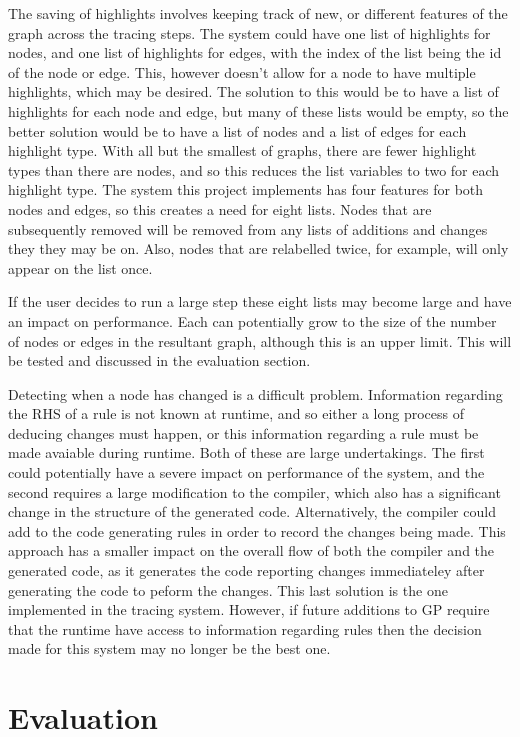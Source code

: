 \documentclass{UoYCSproject}
\begin{document}
The saving of highlights involves keeping track of new, or different features of the graph across the tracing steps. The system could have one list of highlights for nodes, and one list of highlights for edges, with the index of the list being the id of the node or edge. This, however doesn't allow for a node to have multiple highlights, which may be desired. The solution to this would be to have a list of highlights for each node and edge, but many of these lists would be empty, so the better solution would be to have a list of nodes and a list of edges for each highlight type. With all but the smallest of graphs, there are fewer highlight types than there are nodes, and so this reduces the list variables to two for each highlight type. The system this project implements has four features for both nodes and edges, so this creates a need for eight lists. Nodes that are subsequently removed will be removed from any lists of additions and changes they they may be on. Also, nodes that are relabelled twice, for example, will only appear on the list once.

If the user decides to run a large step these eight lists may become large and have an impact on performance. Each can potentially grow to the size of the number of nodes or edges in the resultant graph, although this is an upper limit. This will be tested and discussed in the evaluation section. %

Detecting when a node has changed is a difficult problem. Information regarding the RHS of a rule is not known at runtime, and so either a long process of deducing changes must happen, or this information regarding a rule must be made avaiable during runtime. Both of these are large undertakings. The first could potentially have a severe impact on performance of the system, and the second requires a large modification to the compiler, which also has a significant change in the structure of the generated code. Alternatively, the compiler could add to the code generating rules in order to record the changes being made. This approach has a smaller impact on the overall flow of both the compiler and the generated code, as it generates the code reporting changes immediateley after generating the code to peform the changes. This last solution is the one implemented in the tracing system. However, if future additions to GP require that the runtime have access to information regarding rules then the decision made for this system may no longer be the best one.

\chapter{Evaluation}
\end{document}
